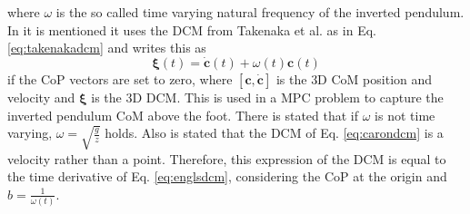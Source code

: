 where $\omega$ is the so called time varying natural frequency of the inverted pendulum.\\
In \cite{caron2018capturability} it is mentioned it uses the \ac{DCM} from Takenaka et al. as in Eq. \eqref{eq:takenakadcm} and writes this as 
\begin{equation}
\boldsymbol{\xi}(t) = \boldsymbol{\dot{c}}(t) + \omega(t)\boldsymbol{c}(t)
\label{eq:carondcm}
\end{equation}
if the \ac{CoP} vectors are set to zero, where $[\boldsymbol{c},\boldsymbol{\dot{c}}]$ is the \ac{3D} \ac{CoM} position and velocity and $\boldsymbol{\xi}$ is the \ac{3D} \ac{DCM}. This is used in a \ac{MPC} problem to capture the inverted pendulum \ac{CoM} above the foot. There is stated that if $\omega$ is not time varying, $\omega=\sqrt{\frac{g}{z}}$ holds. Also is stated that the \ac{DCM} of Eq. \eqref{eq:carondcm} is a velocity rather than a point. Therefore, this expression of the \ac{DCM} is equal to the time derivative of Eq. \eqref{eq:englsdcm}, considering the \ac{CoP} at the origin and $b=\frac{1}{\omega(t)}$.

